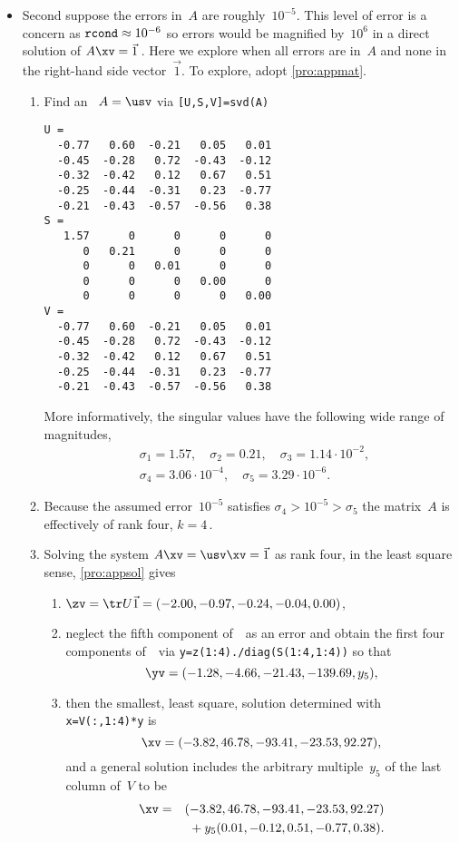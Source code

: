 \begin{example}
\begin{solution}
\begin{itemize}
\item Second suppose the errors in~\(A\) are roughly~\(10^{-5}\).
This level of error is a concern as \(\verb|rcond|\approx10^{-6}\) so errors would be magnified by~\(10^6\) in a direct solution of \(A\xv=\vec1\)\,.
Here we explore when all errors are in~\(A\) and none in the right-hand side vector~\(\vec 1\).
To explore, adopt \autoref{pro:appmat}.
\begin{enumerate}
\item Find an \svd\ \(A=\usv\) via \verb|[U,S,V]=svd(A)| \twodp
\begin{verbatim}
U =
  -0.77   0.60  -0.21   0.05   0.01
  -0.45  -0.28   0.72  -0.43  -0.12
  -0.32  -0.42   0.12   0.67   0.51
  -0.25  -0.44  -0.31   0.23  -0.77
  -0.21  -0.43  -0.57  -0.56   0.38
S =
   1.57      0      0      0      0
      0   0.21      0      0      0
      0      0   0.01      0      0
      0      0      0   0.00      0
      0      0      0      0   0.00
V =
  -0.77   0.60  -0.21   0.05   0.01
  -0.45  -0.28   0.72  -0.43  -0.12
  -0.32  -0.42   0.12   0.67   0.51
  -0.25  -0.44  -0.31   0.23  -0.77
  -0.21  -0.43  -0.57  -0.56   0.38
\end{verbatim}
More informatively, the singular values have the following wide range of magnitudes, 
\begin{eqnarray*}
&&\sigma_1=1.57,\quad
\sigma_2=0.21,\quad
\sigma_3=1.14\cdot10^{-2},\quad
\\&&
\sigma_4=3.06\cdot10^{-4},\quad
\sigma_5=3.29\cdot10^{-6}.
\end{eqnarray*}
\item Because the assumed error~\(10^{-5}\) satisfies \(\sigma_4>10^{-5}>\sigma_5\) the matrix~\(A\) is effectively of rank four, \(k=4\)\,.
\item Solving the system \(A\xv=\usv\xv=\vec1\) as rank four, in the least square sense, \autoref{pro:appsol} gives \twodp
\begin{enumerate}
\item \(\zv=\tr U\vec1=(-2.00,-0.97,-0.24,-0.04,0.00)\),
\item neglect the fifth component of~\zv\ as an error and obtain the first four components of~\yv\ via \verb|y=z(1:4)./diag(S(1:4,1:4))| so that
\begin{equation*}
\yv=(-1.28,-4.66,-21.43,-139.69,y_5),
\end{equation*}

\item then the smallest, least square, solution determined with 
\verb|x=V(:,1:4)*y| is
\begin{equation*}
\xv=(-3.82,46.78,-93.41,-23.53,92.27),
\end{equation*}
and a general solution includes the arbitrary multiple~\(y_5\) of the last column of~\(V\) to be
\begin{eqnarray*}
\xv&=&(-3.82,46.78,-93.41,-23.53,92.27)
\\&&{}+y_5(0.01,-0.12,0.51,-0.77,0.38).
\end{eqnarray*}
\end{enumerate}
\end{enumerate}


\end{itemize}
\end{solution}
\end{example}
